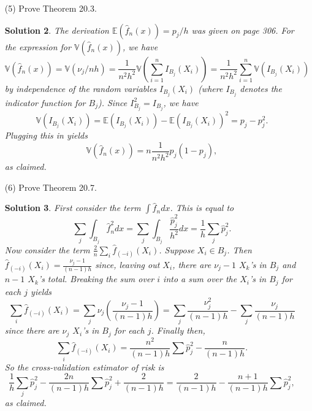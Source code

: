 \documentclass[10pt]{article}
\newtheorem*{sol}{Solution}
\newcommand{\V}{\mathbb{V}}
\newcommand{\E}{\mathbb{E}}
\begin{document}
\begin{enumerate}
\begin{sol}
We have
\[
\E(L(g,\hat g)) = \E\left(\int (gx - \hat gx)^2dx\right) =
\int \E(gx - \hat gx)^2 dx
\]
by changing the order of integration. This is equal to
\[
\int \E(gx - \E(\hat gx) + \E(\hat gx) - \hat gx)^2 dx
\]
The integrand is equal to
\[
v(x) + \E((gx - \E(\hat gx))^2  - 2(gx-\E(\hat gx))(\hat gx - \E(\hat gx)))
\]
so we need to confirm
\[
\E((gx - \E(\hat gx))^2  - 2(gx-\E(\hat gx))(\hat gx - \E(\hat gx))) = b(x)^2.
\]
We expand the argument to $\E(\cdot)$ as
\[
gx^2 - 2gx\E(\hat gx) + (\E\hat gx)^2 - 2(gx)(\hat gx) + 2(gx)\E(\hat gx) +
2(\hat gx)\E(\hat gx) - 2 (\E\hat gx)^2
\]
and this is equal to
\[
- (\E \hat gx)^2 + gx^2 - 2(gx)(\hat gx) + 2(\hat gx)\E(\hat gx).
\]
Taking the expectation yields
\[
-(\E \hat gx)^2 + gx^2 - 2 gx(\E \hat gx) + 2(\E\hat gx)^2
= (\E \hat gx)^2 - 2(gx)(\E\hat gx) + (gx)^2 = b(x)^2
\]
as claimed.
\end{sol}

\item[(5)]
Prove Theorem 20.3.

\begin{sol}
The derivation $\E(\hat f_n(x))=p_j/h$ was given on page 306. For the expression for
$\V(\hat f_n(x))$, we have
\[
\V(\hat f_n(x))=\V(\nu_j/{nh})=\frac{1}{n^2h^2}\V\left(\sum_{i=1}^n I_{B_j}(X_i)\right)=
\frac{1}{n^2h^2}\sum_{i=1}^n \V(I_{B_j}(X_i))
\]
by independence of the random variables $I_{B_j}(X_i)$ (where $I_{B_j}$ denotes
the indicator function for $B_j$). Since $I_{B_j}^2 = I_{B_j}$, we have
\[
\V(I_{B_j}(X_i)) = \E(I_{B_j}(X_i)) - \E(I_{B_j}(X_i))^2 = p_j - p_j^2.
\]
Plugging this in yields
\[
\V(\hat f_n(x)) = n \frac{1}{n^2h^2} p_j(1-p_j),
\]
as claimed.
\end{sol}

\item[(6)] Prove Theorem 20.7.

\begin{sol}
First consider the term $\int \hat f_n dx$. This is equal to
\[
\sum_j \int_{B_j} \hat f_n^2 dx = \sum_j \int_{B_j} \frac{\hat p_j^2}{h^2}dx
= \frac{1}{h} \sum_j \hat p_j^2.
\]
Now consider the term $\frac{2}{n}\sum_i \hat f_{(-i)}(X_i)$. Suppose
$X_i\in B_j$. Then $\hat f_{(-i)}(X_i)=\frac{\nu_j-1}{(n-1)h}$ since,
leaving out $X_i$, there are $\nu_j-1$ $X_k$'s in $B_j$ and $n-1$ $X_k$'s total.
Breaking the sum over $i$ into a sum over the $X_i$'s in $B_j$ for each $j$ yields
\[
\sum_i \hat f_{(-i)}(X_i) = \sum_j \nu_j \left(\frac{\nu_j-1}{(n-1)h}\right)
= \sum_j \frac{\nu_j^2}{(n-1)h} - \sum_j \frac{\nu_j}{(n-1)h}
\]
since there are $\nu_j$ $X_i$'s in $B_j$ for each $j$. Finally then,
\[
\sum_i \hat f_{(-i)}(X_i) = \frac{n^2}{(n-1)h} \sum \hat p_j^2 - \frac{n}{(n-1)h}.
\]
So the cross-validation estimator of risk is
\[
\frac{1}{h} \sum_j \hat p_j^2 - \frac{2n}{(n-1)h} \sum \hat p_j^2 + \frac{2}{(n-1)h}
= \frac{2}{(n-1)h} - \frac{n+1}{(n-1)h}\sum \hat p_j^2,
\]
as claimed.
\end{sol}

\end{enumerate}
\end{document}
